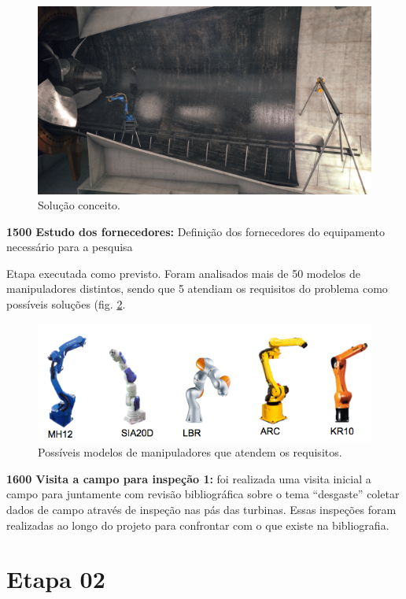 \begin{figure}
\centering
\label{fig::conceito}
\includegraphics[width=0.9\columnwidth]{figs/turbine_evo}
\caption{Solução conceito.}
\end{figure}

\noindent
\textbf{1500 Estudo dos fornecedores:} Definição dos fornecedores do equipamento
necessário para a pesquisa

Etapa executada como previsto. Foram analisados mais de 50 modelos de
manipuladores distintos, sendo que 5 atendiam os requisitos do problema como
possíveis soluções (fig. \ref{fig::modelos_robos}.

\begin{figure}[h!]
\centering
\label{fig::modelos_robos}
\includegraphics[width=0.9\columnwidth]{figs/robots}
\caption{Possíveis modelos de manipuladores que atendem os requisitos.}
\end{figure}

\noindent
\textbf{1600 Visita a campo para inspeção 1:} foi realizada uma visita inicial
a campo para juntamente com revisão bibliográfica sobre o tema “desgaste”
coletar dados de campo através de inspeção nas pás das turbinas. Essas inspeções
foram realizadas ao longo do projeto para confrontar com o que existe na
bibliografia.


\section{Etapa 02}

